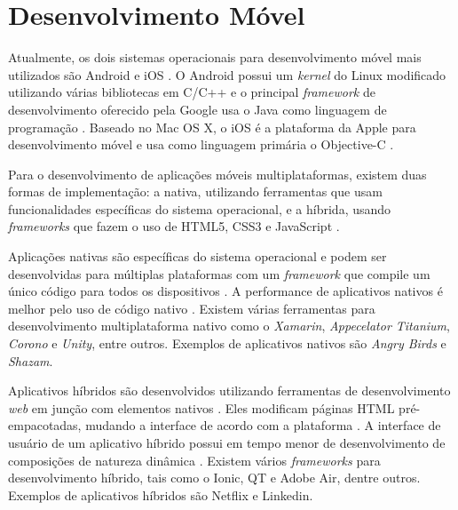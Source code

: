 \section{Desenvolvimento Móvel}

Atualmente, os dois sistemas operacionais para desenvolvimento móvel mais utilizados são Android e iOS \cite{gartner-top-os}. O Android possui um \textit{kernel} do Linux modificado utilizando várias bibliotecas em C/C++ \cite{mobile-dev} e o principal \textit{framework} de desenvolvimento oferecido pela Google usa o Java como linguagem de programação \cite{android}. Baseado no Mac OS X, o iOS é a plataforma da Apple para desenvolvimento móvel e usa como linguagem primária o Objective-C \cite{mobile-dev}.

Para o desenvolvimento de aplicações móveis multiplataformas, existem duas formas de implementação: a nativa, utilizando ferramentas que usam funcionalidades específicas do sistema operacional, e a híbrida, usando \textit{frameworks} que fazem o uso de HTML5, CSS3 e JavaScript \cite{mobile-dev-2}.

Aplicações nativas são específicas do sistema operacional e podem ser desenvolvidas para múltiplas plataformas com um \textit{framework} que compile um único código para todos os dispositivos \cite{hybrid-1}. A performance de aplicativos nativos é melhor pelo uso de código nativo \cite{hybrid-2}. Existem várias ferramentas para desenvolvimento multiplataforma nativo como o \textit{Xamarin}, \textit{Appecelator Titanium}, \textit{Corono} e \textit{Unity}, entre outros. Exemplos de aplicativos nativos são \textit{Angry Birds} e \textit{Shazam}.

Aplicativos híbridos são desenvolvidos utilizando ferramentas de desenvolvimento \textit{web} em junção com elementos nativos \cite{hybrid-1}. Eles modificam páginas HTML pré-empacotadas, mudando a interface de acordo com a plataforma \cite{hybrid-2}. A interface de usuário de um aplicativo híbrido possui em tempo menor de desenvolvimento de composições de natureza dinâmica \cite{mobile-dev-2}. Existem vários \textit{frameworks} para desenvolvimento híbrido, tais como o Ionic, QT e Adobe Air, dentre outros. Exemplos de aplicativos híbridos são Netflix e Linkedin.
